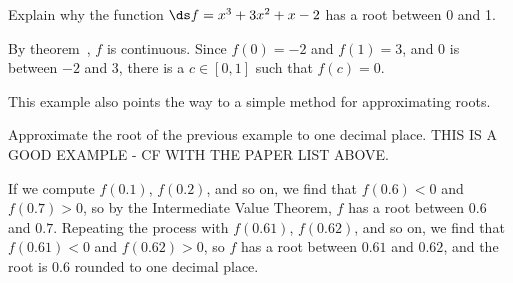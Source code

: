 \begin{example} Explain why the function $\ds f=x^3 + 3x^2+x-2$ has a root between 0
and 1.

By theorem~, $f$ is continuous.
Since $f(0)=-2$ and $f(1)=3$, and $0$ is between $-2$ and $3$, there
is a $c\in[0,1]$ such that $f(c)=0$.
\end{example}

This example also points the way to a simple method for approximating
roots. 

\begin{example} Approximate the root of the previous example  to one decimal
place. THIS IS A GOOD EXAMPLE - CF WITH THE PAPER LIST ABOVE.

If we compute $f(0.1)$, $f(0.2)$, and so on, we find that 
$f(0.6)<0$ and $f(0.7)>0$, so by the Intermediate Value Theorem, $f$
has a root between $0.6$ and $0.7$. Repeating the process with
$f(0.61)$, $f(0.62)$, and so on, we find that
$f(0.61)<0$ and $f(0.62)>0$, so $f$ has a root between
$0.61$ and $0.62$, and the root is $0.6$ rounded to one decimal place.
\end{example}


